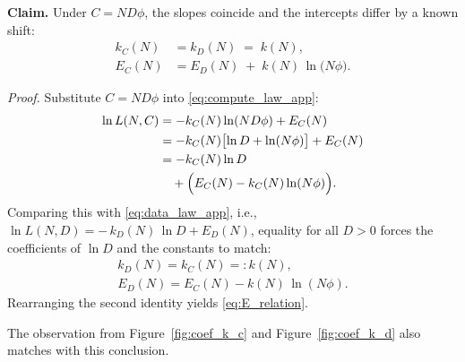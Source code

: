 \medskip
\noindent\textbf{Claim.}
Under \(C = N D \phi\), the slopes coincide and the intercepts differ by a known shift:
\begin{align}
    k_C(N) &= k_D(N) \;=\; k(N), \label{eq:k_equal}\\
    E_C(N) &= E_D(N) \;+\; k(N)\,\ln\!\bigl(N\phi\bigr). \label{eq:E_relation}
\end{align}

\medskip
\noindent\textit{Proof.}
Substitute \(C=N D \phi\) into \eqref{eq:compute_law_app}:
\begin{align*}
\ln L(N,C)
&= -k_C(N)\ln(N D \phi) + E_C(N) \\
&= -k_C(N)\bigl[\ln D + \ln(N\phi)\bigr] + E_C(N) \\
&= -k_C(N)\ln D \nonumber \\
&\quad + \Bigl(E_C(N) - k_C(N)\ln(N\phi)\Bigr).
\end{align*}
Comparing this with \eqref{eq:data_law_app}, i.e.,
\(\ln L(N,D) = -\,k_D(N)\,\ln D + E_D(N)\),
equality for all \(D>0\) forces the coefficients of \(\ln D\) and the constants to match:
\begin{align*}
k_D(N)=k_C(N)=:k(N),\\
E_D(N)=E_C(N)-k(N)\,\ln(N\phi).
\end{align*}
Rearranging the second identity yields \eqref{eq:E_relation}.

The observation from Figure~\ref{fig:coef_k_c} and Figure~\ref{fig:coef_k_d} also matches with this conclusion.
